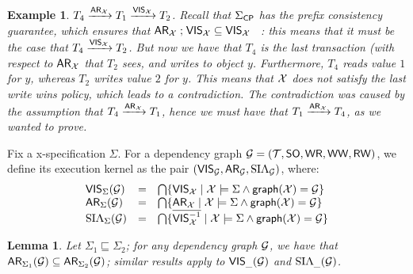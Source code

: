 \documentclass[a4paper,UKenglish]{article}%
\theoremstyle{plain}
\newtheorem{lemma}[thm]{\sc Lemma}
\newtheorem{example}[thm]{\sc Example}
\begin{document}
\begin{example}
$T_4 \xrightarrow{{\sf{AR}}_{\mathcal{X}}} T_1 \xrightarrow{{\mathsf{VIS}}_{\mathcal{X}}} T_2$. Recall that 
$\Sigma_{\mathsf{CP}}$ has the prefix consistency guarantee, which ensures that  
${\sf{AR}}_{\mathcal{X}} \mathrel{;} {\mathsf{VIS}}_{\mathcal{X}} \subseteq {\mathsf{VIS}}_{\mathcal{X}}$\
: this means that it must be the case that $T_4 \xrightarrow{{\mathsf{VIS}}_{\mathcal{X}}} T_2$. But 
now we have that $T_4$ is the last transaction (with respect to ${\sf{AR}}_{\mathcal{X}}$ 
that $T_2$ sees, and writes to object $y$. Furthermore, $T_4$ reads value $1$ for $y$, 
whereas $T_2$ writes value $2$ for $y$. This means that $\mathcal{X}$ does not satisfy the 
last write wins policy, which leads to a contradiction. The contradiction was caused 
by the assumption that $T_4 \xrightarrow{{\sf{AR}}_{\mathcal{X}}} T_1$, hence we must have 
that $T_1 \xrightarrow{{\sf{AR}}_{\mathcal{X}}} T_4$, as we wanted to prove.
\end{example}

Fix a x-specification $\Sigma$. For a dependency graph $\mathcal{G} = (\mathcal{T}, {\sf{SO}}, {\mathsf{WR}}, {\mathsf{WW}}, {\mathsf{RW}})$, we define 
its execution kernel as the pair $(\VIS_{\G}, \AR_{\G}, \AVIS_{\G})$, where: 
\[
\begin{array}{lcl}
\VIS_{\Sigma}(\G) &=& \bigcap \{ \VIS_{\aexec} \mid \aexec \models \Sigma \wedge \graphof(\aexec) = \G\}\\
\AR_{\Sigma}(\G) &=& \bigcap \{ \AR_{\aexec} \mid \aexec \models \Sigma \wedge \graphof(\aexec) = \G\}\\
\AVIS_{\Sigma}(\G) &=& \bigcap \{ \overline{\VIS_{\aexec}^{-1}} \mid \aexec \models \Sigma \wedge \graphof(\aexec) = \G\}
\end{array}
\]

\begin{lemma}
\label{lem:kernel.inclusion}
Let $\Sigma_1 \sqsubseteq \Sigma_2$; for any dependency graph $\mathcal{G}$, 
we have that ${\sf{AR}}_{\Sigma_1}(\mathcal{G}) \subseteq {\sf{AR}}_{\Sigma_2}(\mathcal{G})$; 
similar results apply to ${\mathsf{VIS}}_{\_}(\mathcal{G})$ and $\AVIS_{\_}(\G)$.
\end{lemma}
\end{document}
